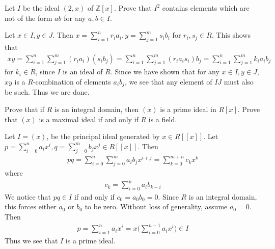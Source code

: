 \documentclass[12pt]{exam}
\theoremstyle{plain} %
\theoremstyle{definition} %
\theoremstyle{remark} %
\begin{document}
\begin{questions}
  \question
  Let $I$ be the ideal $(2, x)$ of $\mathbb{Z}[x]$. Prove that $I^2$
  contains elements which are not of the form $ab$ for any $a, b \in I$.
  \begin{solution}
    Let $x \in I, y \in J$. Then $x = \sum_{i = 1}^{n} r_i a_i, y =
    \sum_{j = 1}^{m} s_i b_i$ for $r_i, s_j \in R$. This shows that
    \begin{align*}
      xy = \sum_{i = 1}^{n} \sum_{j = 1}^{m} (r_i a_i) (s_i b_j) =
      \sum_{i = 1}^{n} \sum_{j = 1}^{m} (r_i a_i s_i)b_j = \sum_{i =
      1}^{n}  \sum_{j = 1}^{m} k_i a_ib_j
    \end{align*}
    for $k_i \in R$, since $ I$ is an ideal of $R$. Since we have
    shown that for any $x \in I, y \in J$, $xy$ is a $R$-combination
    of elements $a_ib_j$, we see that any element of $IJ$ must also
    be such. Thus we are done.
  \end{solution}

  \question
  Prove that if $R$ is an integral domain, then $(x)$ is a prime
  ideal in $R[x]$. Prove that $(x)$ is a maximal ideal if and only if
  $R$ is a field.
  \begin{solution}
    Let $I = (x)$, be the principal ideal generated by $x \in
    R[[x]]$. Let $p = \sum_{i = 0}^{n} a_i x^i, q = \sum_{j =
    0}^{m} b_jx^j \in R[[x]]$. Then
    \begin{align*}
      pq = \sum_{i = 0}^{n} \sum_{j = 0}^{m} a_ib_j x^{i + j} =
      \sum_{k = 0}^{m+n} c_k x^k
    \end{align*}
    where
    \begin{align*}
      c_k = \sum_{i = 0}^{k} a_{i}b_{k-i}
    \end{align*}
    We notice that $pq \in I$ if and only if $c_0 = a_0b_0 = 0$.
    Since $R$ is an integral domain, this forces either $a_0$ or
    $b_0$ to be zero. Without loss of generality, assume $a_0 = 0$. Then
    \begin{align*}
      p = \sum_{i = 1}^{n} a_i x^i = x \Big( \sum_{i = 0}^{n-1} a_i
      x^i \Big) \in I
    \end{align*}
    Thus we see that $I$ is a prime ideal.


\end{solution}
\end{questions}
\end{document}
